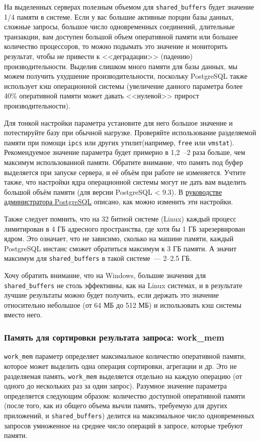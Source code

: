 На выделенных серверах полезным объемом для \lstinline!shared_buffers! будет значение 1/4 памяти в системе. Если у вас большие активные порции базы данных, сложные запросы, большое число одновременных соединений, длительные транзакции, вам доступен большой объем оперативной памяти или большее количество процессоров, то можно подымать это значение и мониторить результат, чтобы не привести к <<деградации>> (падению) производительности. Выделив слишком много памяти для базы данных, мы можем получить ухудшение производительности, поскольку PostgreSQL также использует кэш операционной системы (увеличение данного параметра более 40\% оперативной памяти может давать <<нулевой>> прирост производительности).

Для тонкой настройки параметра установите для него большое значение и потестируйте базу при обычной нагрузке. Проверяйте использование разделяемой памяти при помощи \lstinline!ipcs! или других утилит(например, \lstinline!free! или \lstinline!vmstat!). Рекомендуемое значение параметра будет примерно в 1,2~--2 раза больше, чем максимум использованной памяти. Обратите внимание, что память под буфер выделяется при запуске сервера, и её объём при работе не изменяется. Учтите также, что настройки ядра операционной системы могут не дать вам выделить большой объём памяти (для версии PostgreSQL < 9.3). В \href{http://www.postgresql.org/docs/current/static/kernel-resources.html}{руководстве администратора PostgreSQL} описано, как можно изменить эти настройки.

Также следует помнить, что на 32 битной системе (Linux) каждый процесс лимитирован в 4 ГБ адресного пространства, где хотя бы 1 ГБ зарезервирован ядром. Это означает, что не зависимо, сколько на машине памяти, каждый PostgreSQL инстанс сможет обратиться максимум к 3 ГБ памяти. А значит максимум для \lstinline!shared_buffers! в такой системе~--- 2--2.5 ГБ.

Хочу обратить внимание, что на Windows, большие значения для \lstinline!shared_buffers! не столь эффективны, как на Linux системах, и в результате лучшие результаты можно будет получить, если держать это значение относительно небольшое (от 64 МБ до 512 МБ) и использовать кэш системы вместо него.


\subsubsection{Память для сортировки результата запроса: work\_mem}


\lstinline!work_mem! параметр определяет максимальное количество оперативной памяти, которое может выделить одна операция сортировки, агрегации и др. Это не разделяемая память, \lstinline!work_mem! выделяется отдельно на каждую операцию (от одного до нескольких раз за один запрос). Разумное значение параметра определяется следующим образом: количество доступной оперативной памяти (после того, как из общего объема вычли память, требуемую для других приложений, и \lstinline!shared_buffers!) делится на максимальное число одновременных запросов умноженное на среднее число операций в запросе, которые требуют памяти.

